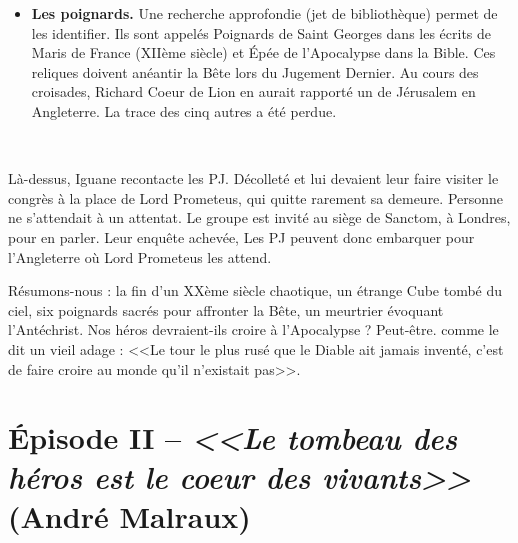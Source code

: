 \documentclass[11pt,twoside,a4paper]{book}
\begin{document}
\begin{itemize}
	\item \textbf{Les poignards. }Une recherche approfondie (jet de biblioth{\`e}que) permet de les identifier. Ils sont appel{\'e}s Poignards de Saint Georges dans les {\'e}crits de Maris de France (XII{\`e}me si{\`e}cle) et {\'E}p{\'e}e de l'Apocalypse dans la Bible. Ces reliques doivent an{\'e}antir la B{\^e}te lors du Jugement Dernier. Au cours des croisades, Richard Coeur de Lion en aurait rapport{\'e} un de J{\'e}rusalem en Angleterre. La trace des cinq autres a {\'e}t{\'e} perdue.
\end{itemize} ~\\
\setlength\parindent{0pt}

L{\`a}-dessus, Iguane recontacte les PJ. D{\'e}collet{\'e} et lui devaient leur faire visiter le congr{\`e}s {\`a} la place de Lord Prometeus, qui quitte rarement sa demeure. Personne ne s'attendait {\`a} un attentat. Le groupe est invit{\'e} au si{\`e}ge de Sanctom, {\`a} Londres, pour en parler. Leur enqu{\^e}te achev{\'e}e, Les PJ peuvent donc embarquer pour l'Angleterre o{\`u} Lord Prometeus les attend.~\\

\clearpage

R{\'e}sumons-nous : la fin d'un XX{\`e}me si{\`e}cle chaotique, un {\'e}trange Cube tomb{\'e} du ciel, six poignards sacr{\'e}s pour affronter la B{\^e}te, un meurtrier {\'e}voquant l'Ant{\'e}christ. Nos h{\'e}ros devraient-ils croire {\`a} l'Apocalypse ? Peut-{\^e}tre. comme le dit un vieil adage : <<Le tour le plus rus{\'e} que le Diable ait jamais invent{\'e}, c'est de faire croire au monde qu'il n'existait pas>>.~\\


\section*{{\'E}pisode II -- \emph{<<\textbf{Le tombeau des h{\'e}ros est le coeur des vivants}>>} (Andr{\'e} Malraux)}~\\

\end{document}
